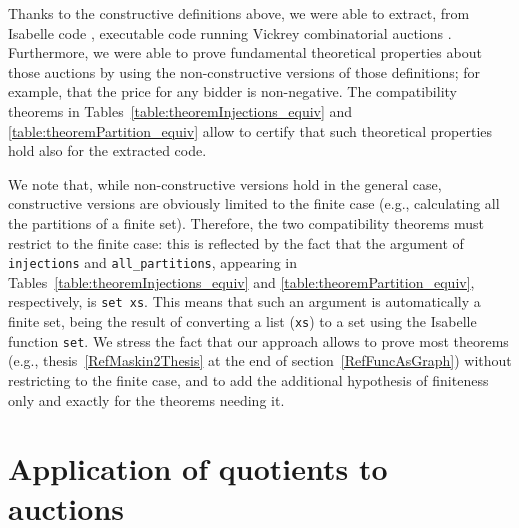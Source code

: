 \documentclass[
]{llncs}
\newcommand{\junction}{compatibility}
\newcommand{\I}{Isabelle}
\newcommand{\query}[1]{\marginnote{\raggedright\footnotesize\itshape\hrule\smallskip{#1}\smallskip\hrule}}\renewcommand{\query}[1]{} \newcommand{\rnote}[1]{\query{#1}}
\newcommand{\lnote}[1]{\reversemarginpar\query{#1}\normalmarginpar}
\begin{document}
Thanks to the constructive definitions above, we were able to 
extract, from \I{} code \cite{haftmann2010code}, executable code running Vickrey combinatorial auctions
\cite{CKLR:SoundCombVickCode13}.
Furthermore, we were able to prove fundamental theoretical properties about those auctions by using the non-constructive versions of those definitions; for example, that the price for any bidder is non-negative.
The \junction{} theorems in Tables~\ref{table:theoremInjections_equiv} and \ref{table:theoremPartition_equiv}
allow to certify that such theoretical properties hold also for the extracted code.

\lnote{MC: Added for clarification following reviewer2.}
We note that, while non-constructive versions hold in the general case, constructive versions are obviously limited to the finite case (e.g., calculating all the partitions of a finite set).
Therefore, the two \junction{} theorems must restrict to the finite case: this is reflected by the fact that the argument of \verb|injections| and \verb|all_partitions|, appearing in Tables~\ref{table:theoremInjections_equiv} and \ref{table:theoremPartition_equiv}, respectively, is \verb|set xs|.\rnote{MK: respectively after}
This means that such an argument is automatically a finite set, being the result of converting a list (\verb|xs|) to a set using the \I{} function \verb|set|.
We stress the fact that our approach allows to prove most theorems 
(e.g., thesis~\eqref{RefMaskin2Thesis} at the end of section~\ref{RefFuncAsGraph}) without restricting to the finite case, and to add the additional hypothesis of finiteness only and exactly for the theorems needing it.








































\section{Application of quotients 
to auctions}
\label{RefApplication}
\end{document}
